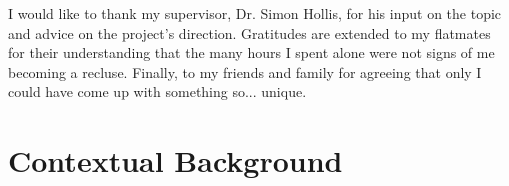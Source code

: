 \documentclass[ %
                    author={Luke Murray},
                supervisor={Dr. Simon Hollis},
                     title={Shadow Peer-to-Peer Networks},
                  subtitle={},
                    degree={MEng},
                      year={2013} ]{thesis}
\begin{document}
I would like to thank my supervisor, Dr. Simon Hollis, for his input on the topic and advice on the project's direction. Gratitudes are extended to my flatmates for their understanding that the many hours I spent alone were not signs of me becoming a recluse. Finally, to my friends and family for agreeing that only I could have come up with something so... unique.


%

\mainmatter


\chapter{Contextual Background}
\label{chap:context}
\end{document}
